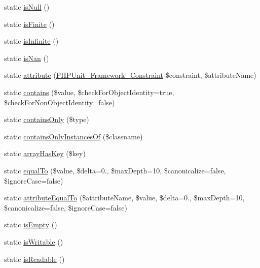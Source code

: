 \begin{DoxyCompactItemize}
\item 
static \mbox{\hyperlink{class_p_h_p_unit___framework___assert_a84113959d7b6e3a8f79f3d4e6d3ff792}{is\+Null}} ()
\item 
static \mbox{\hyperlink{class_p_h_p_unit___framework___assert_a991e411ffff9642316db83969d8ffc20}{is\+Finite}} ()
\item 
static \mbox{\hyperlink{class_p_h_p_unit___framework___assert_ac8cfcd770d31fd4f4dfb7c2a6111fe73}{is\+Infinite}} ()
\item 
static \mbox{\hyperlink{class_p_h_p_unit___framework___assert_a4c62604014a69d13ca70d0b35e94092a}{is\+Nan}} ()
\item 
static \mbox{\hyperlink{class_p_h_p_unit___framework___assert_afbb710ca6b7ec58626be36fecd593f2c}{attribute}} (\mbox{\hyperlink{class_p_h_p_unit___framework___constraint}{P\+H\+P\+Unit\+\_\+\+Framework\+\_\+\+Constraint}} \$constraint, \$attribute\+Name)
\item 
static \mbox{\hyperlink{class_p_h_p_unit___framework___assert_a35d1fc4f774ce4d597f740e0ed43495e}{contains}} (\$value, \$check\+For\+Object\+Identity=true, \$check\+For\+Non\+Object\+Identity=false)
\item 
static \mbox{\hyperlink{class_p_h_p_unit___framework___assert_a866329e575da2c9a9130af105922397d}{contains\+Only}} (\$type)
\item 
static \mbox{\hyperlink{class_p_h_p_unit___framework___assert_a548b929c8c7787b9719a3911dd7eaa4a}{contains\+Only\+Instances\+Of}} (\$classname)
\item 
static \mbox{\hyperlink{class_p_h_p_unit___framework___assert_afaa89924d193bfdaa5ee4526515ddfe4}{array\+Has\+Key}} (\$key)
\item 
static \mbox{\hyperlink{class_p_h_p_unit___framework___assert_a66c8e09330ad5201f515d1842b017a55}{equal\+To}} (\$value, \$delta=0., \$max\+Depth=10, \$canonicalize=false, \$ignore\+Case=false)
\item 
static \mbox{\hyperlink{class_p_h_p_unit___framework___assert_a5024ecfc2c18cb02a3b9b9a2184c936c}{attribute\+Equal\+To}} (\$attribute\+Name, \$value, \$delta=0., \$max\+Depth=10, \$canonicalize=false, \$ignore\+Case=false)
\item 
static \mbox{\hyperlink{class_p_h_p_unit___framework___assert_aa4780c055395206e57fb4ec8aa33ce52}{is\+Empty}} ()
\item 
static \mbox{\hyperlink{class_p_h_p_unit___framework___assert_a849d18b134751834110a62dc298ec945}{is\+Writable}} ()
\item 
static \mbox{\hyperlink{class_p_h_p_unit___framework___assert_a2e5a9a2013055d503a04a9902f32fa30}{is\+Readable}} ()

\end{DoxyCompactItemize}
